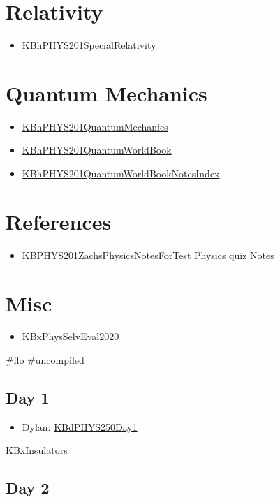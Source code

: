 \documentclass[letterpaper]{article}
\begin{document}
\section{Relativity}
\label{sec:orgd375e60}
\begin{itemize}
\item \href{KBhPHYS201SpecialRelativity.org}{KBhPHYS201SpecialRelativity}
\end{itemize}

\section{Quantum Mechanics}
\label{sec:orgd35d008}
\begin{itemize}
\item \href{KBhPHYS201QuantumMechanics.org}{KBhPHYS201QuantumMechanics}
\item \href{KBhPHYS201QuantumWorldBook.org}{KBhPHYS201QuantumWorldBook}
\item \href{KBhPHYS201QuantumWorldBookNotesIndex.org}{KBhPHYS201QuantumWorldBookNotesIndex}
\end{itemize}

\section{References}
\label{sec:org4fe3a54}
\begin{itemize}
\item \href{KBPHYS201ZachsPhysicsNotesForTest.org}{KBPHYS201ZachsPhysicsNotesForTest}
Physics quiz Notes
\end{itemize}

\section{Misc}
\label{sec:org94376de}
\begin{itemize}
\item \href{KBxPhysSelvEval2020.org}{KBxPhysSelvEval2020}
\end{itemize}

\#flo \#uncompiled

\subsection{Day 1}
\label{sec:org8179263}
\begin{itemize}
\item Dylan: \href{KBdPHYS250Day1.org}{KBdPHYS250Day1}
\end{itemize}

\href{KBxInsulators.org}{KBxInsulators}

\subsection{Day 2}
\label{sec:orgf076ab8}
\end{document}
